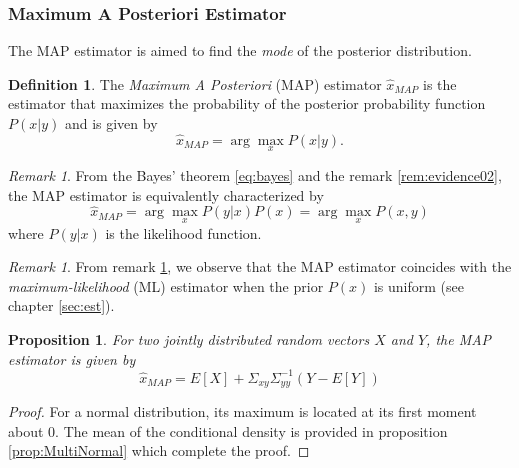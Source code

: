 \documentclass{article}
\newtheorem{prop}[thm]{Proposition}
\theoremstyle{definition}
\newtheorem{definition}[thm]{Definition}
\theoremstyle{remark}
\newtheorem{remark}[thm]{Remark}
\begin{document}
\subsubsection{Maximum A Posteriori Estimator}
The MAP estimator is aimed to find the \emph{mode} of the posterior distribution.

\begin{definition}
The \emph{Maximum A Posteriori} (MAP) estimator $\hat{x}_{MAP}$ is the estimator that maximizes the probability of the posterior probability function $P(x|y)$ and is given by
\begin{equation}
\hat{x}_{MAP}=\arg\max_{x} P(x|y).
\end{equation}
\end{definition}

\begin{remark}\label{rem:map}
From the Bayes' theorem \eqref{eq:bayes} and the remark \ref{rem:evidence02}, the MAP estimator is equivalently characterized by
\begin{equation}
\hat{x}_{MAP}=\arg\max_{x} P(y|x)P(x)=\arg\max_{x} P(x,y)
\end{equation}
where $P(y|x)$ is the likelihood function.
\end{remark}

\begin{remark}
From remark \ref{rem:map}, we observe that the MAP estimator coincides with the \emph{maximum-likelihood} (ML) estimator when the prior $P(x)$ is uniform (see chapter \ref{sec:est}).
\end{remark}


\begin{prop}
For two jointly distributed random vectors $X$ and $Y$, the MAP estimator is given by
\begin{equation}
\hat{x}_{MAP}=E[X]+\Sigma_{xy}\Sigma_{yy}^{-1}(Y-E[Y])
\end{equation}
\end{prop}
\begin{proof}
For a normal distribution, its maximum is located at its first moment about $0$. The mean of the conditional density is provided in proposition \ref{prop:MultiNormal} which complete the proof.
\end{proof}
\end{document}
